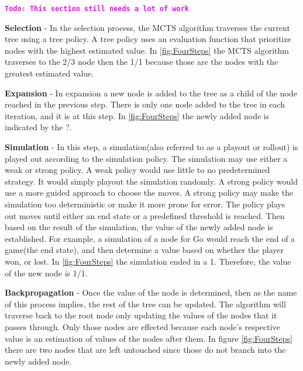 \documentclass{sig-alternate}
\newcommand{\comment}[1]{{\bf \tt  {#1}}}
\newcommand{\todo}[1]{\textcolor{magenta}{\comment{Todo: {#1}}}}
\begin{document}
\todo{This section still needs a lot of work}

\textbf{Selection} - In the selection process, the MCTS algorithm traverses the current tree using a tree policy. A tree policy uses an evaluation function that prioritize nodes with the highest estimated value. In \ref{fig:FourSteps} the MCTS algorithm traverses to the 2/3 node then the 1/1 because those are the nodes with the greatest estimated value.

\textbf{Expansion} - In expansion a new node is added to the tree as a child of the node reached in the previous step. There is only one node added to the tree in each iteration, and it is at this step. In \ref{fig:FourSteps} the newly added node is indicated by the ?.

\textbf{Simulation} - In this step, a simulation(also referred to as a playout or rollout) is played out according to the simulation policy\cite{ActionSelection}. The simulation may use either a weak or strong policy. A weak policy would use little to no predetermined strategy. It would simply playout the simulation randomly. A strong policy would use a more guided approach to choose the moves. A strong policy may make the simulation too deterministic or make it more prone for error\cite{TheGrandChallenge}. The policy plays out moves until either an end state or a predefined threshold is reached. Then based on the result of the simulation, the value of the newly added node is established. For example, a simulation of a node for Go would reach the end of a game(the end state), and then determine a value based on whether the player won, or lost. In \ref{fig:FourSteps} the simulation ended in a 1. Therefore, the value of the new node is 1/1.

\textbf{Backpropagation} - Once the value of the node is determined, then as the name of this process implies, the rest of the tree can be updated. The algorithm will traverse back to the root node only updating the values of the nodes that it passes through. Only those nodes are effected because each node's respective value is an estimation of values of the nodes after them. In figure \ref{fig:FourSteps} there are two nodes that are left untouched since those do not branch into the newly added node.
\end{document}
